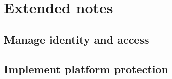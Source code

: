 \section{Extended notes}

\subsection{Manage identity and access}







\clearpage
\subsection{Implement platform protection}


